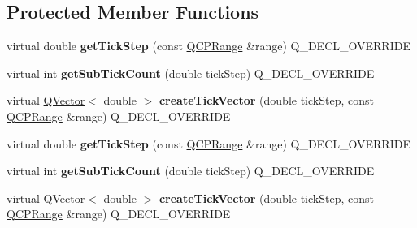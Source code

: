 \subsection*{Protected Member Functions}
\begin{DoxyCompactItemize}
\item 
virtual double {\bfseries get\+Tick\+Step} (const \hyperlink{class_q_c_p_range}{Q\+C\+P\+Range} \&range) Q\+\_\+\+D\+E\+C\+L\+\_\+\+O\+V\+E\+R\+R\+I\+DE\hypertarget{class_q_c_p_axis_ticker_log_a57be974214a065d3247406331f02fa49}{}\label{class_q_c_p_axis_ticker_log_a57be974214a065d3247406331f02fa49}

\item 
virtual int {\bfseries get\+Sub\+Tick\+Count} (double tick\+Step) Q\+\_\+\+D\+E\+C\+L\+\_\+\+O\+V\+E\+R\+R\+I\+DE\hypertarget{class_q_c_p_axis_ticker_log_a352fef7ae68837acd26e35188aa86167}{}\label{class_q_c_p_axis_ticker_log_a352fef7ae68837acd26e35188aa86167}

\item 
virtual \hyperlink{class_q_vector}{Q\+Vector}$<$ double $>$ {\bfseries create\+Tick\+Vector} (double tick\+Step, const \hyperlink{class_q_c_p_range}{Q\+C\+P\+Range} \&range) Q\+\_\+\+D\+E\+C\+L\+\_\+\+O\+V\+E\+R\+R\+I\+DE\hypertarget{class_q_c_p_axis_ticker_log_af8873a8d1d2b9392d8f7a73218c889ab}{}\label{class_q_c_p_axis_ticker_log_af8873a8d1d2b9392d8f7a73218c889ab}

\item 
virtual double {\bfseries get\+Tick\+Step} (const \hyperlink{class_q_c_p_range}{Q\+C\+P\+Range} \&range) Q\+\_\+\+D\+E\+C\+L\+\_\+\+O\+V\+E\+R\+R\+I\+DE\hypertarget{class_q_c_p_axis_ticker_log_af2c27089792fe459395c108ac6721dc7}{}\label{class_q_c_p_axis_ticker_log_af2c27089792fe459395c108ac6721dc7}

\item 
virtual int {\bfseries get\+Sub\+Tick\+Count} (double tick\+Step) Q\+\_\+\+D\+E\+C\+L\+\_\+\+O\+V\+E\+R\+R\+I\+DE\hypertarget{class_q_c_p_axis_ticker_log_aca64621d1a341538bc1afe67e90d85f7}{}\label{class_q_c_p_axis_ticker_log_aca64621d1a341538bc1afe67e90d85f7}

\item 
virtual \hyperlink{class_q_vector}{Q\+Vector}$<$ double $>$ {\bfseries create\+Tick\+Vector} (double tick\+Step, const \hyperlink{class_q_c_p_range}{Q\+C\+P\+Range} \&range) Q\+\_\+\+D\+E\+C\+L\+\_\+\+O\+V\+E\+R\+R\+I\+DE\hypertarget{class_q_c_p_axis_ticker_log_a4d5b72e61eeac27c584eec487f62a52e}{}\label{class_q_c_p_axis_ticker_log_a4d5b72e61eeac27c584eec487f62a52e}

\end{DoxyCompactItemize}
